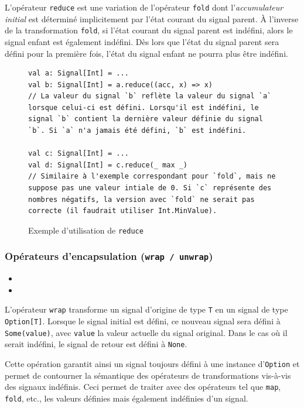 L'opérateur \texttt{reduce} est une variation de l'opérateur \texttt{fold} dont l'\emph{accumulateur initial} est déterminé implicitement par l'état courant du signal parent. À l'inverse de la transformation \texttt{fold}, si l'état courant du signal parent est indéfini, alors le signal enfant est également indéfini. Dès lors que l'état du signal parent sera défini pour la première fois, l'état du signal enfant ne pourra plus être indéfini.

\begin{figure}[h]
	\begin{lstlisting}
val a: Signal[Int] = ...
val b: Signal[Int] = a.reduce((acc, x) => x)
// La valeur du signal `b` reflète la valeur du signal `a` lorsque celui-ci est défini. Lorsqu'il est indéfini, le signal `b` contient la dernière valeur définie du signal `b`. Si `a` n'a jamais été défini, `b` est indéfini.

val c: Signal[Int] = ...
val d: Signal[Int] = c.reduce(_ max _)
// Similaire à l'exemple correspondant pour `fold`, mais ne suppose pas une valeur intiale de 0. Si `c` représente des nombres négatifs, la version avec `fold` ne serait pas correcte (il faudrait utiliser Int.MinValue).
	\end{lstlisting}
	\caption{Exemple d'utilisation de \texttt{reduce}}
\end{figure}

\subsubsection{Opérateurs d'encapsulation (\texttt{wrap / unwrap})}

\begin{itemize}
	\item {}
	\item {}
\end{itemize}

L'opérateur \texttt{wrap} transforme un signal d'origine de type \texttt{T} en un signal de type \texttt{Option[T]}. Lorsque le signal initial est défini, ce nouveau signal sera défini à \texttt{Some(value)}, avec \texttt{value} la valeur actuelle du signal original. Dans le cas où il serait indéfini, le signal de retour est défini à \texttt{None}.

Cette opération garantit ainsi un signal toujours défini à une instance d'\texttt{Option} et permet de contourner la sémantique des opérateurs de transformations vis-à-vis des signaux indéfinis. Ceci permet de traiter avec des opérateurs tel que \texttt{map}, \texttt{fold}, etc., les valeurs définies mais également indéfinies d'un signal.

